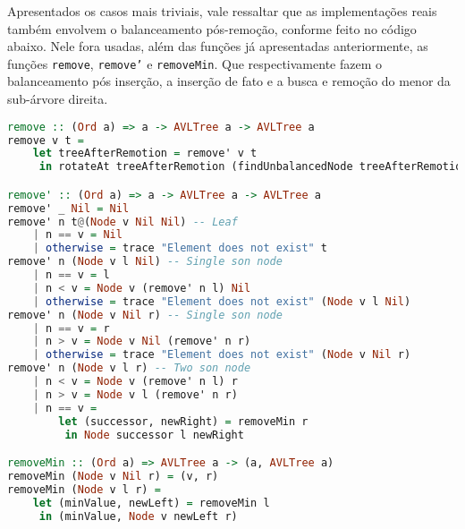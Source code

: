Apresentados os casos mais triviais, vale ressaltar que as implementações reais também envolvem o balanceamento pós-remoção, conforme feito no código abaixo. Nele fora usadas, além das funções já apresentadas anteriormente, as funções \texttt{remove}, \texttt{remove'} e \texttt{removeMin}. Que respectivamente fazem o balanceamento pós inserção, a inserção de fato e a busca e remoção do menor da sub-árvore direita.

\begin{lstlisting}[language=haskell]
remove :: (Ord a) => a -> AVLTree a -> AVLTree a
remove v t =
    let treeAfterRemotion = remove' v t
     in rotateAt treeAfterRemotion (findUnbalancedNode treeAfterRemotion)

remove' :: (Ord a) => a -> AVLTree a -> AVLTree a
remove' _ Nil = Nil
remove' n t@(Node v Nil Nil) -- Leaf
    | n == v = Nil
    | otherwise = trace "Element does not exist" t
remove' n (Node v l Nil) -- Single son node
    | n == v = l
    | n < v = Node v (remove' n l) Nil
    | otherwise = trace "Element does not exist" (Node v l Nil)
remove' n (Node v Nil r) -- Single son node
    | n == v = r
    | n > v = Node v Nil (remove' n r)
    | otherwise = trace "Element does not exist" (Node v Nil r)
remove' n (Node v l r) -- Two son node
    | n < v = Node v (remove' n l) r
    | n > v = Node v l (remove' n r)
    | n == v =
        let (successor, newRight) = removeMin r
         in Node successor l newRight

removeMin :: (Ord a) => AVLTree a -> (a, AVLTree a)
removeMin (Node v Nil r) = (v, r)
removeMin (Node v l r) =
    let (minValue, newLeft) = removeMin l
     in (minValue, Node v newLeft r)
\end{lstlisting}
